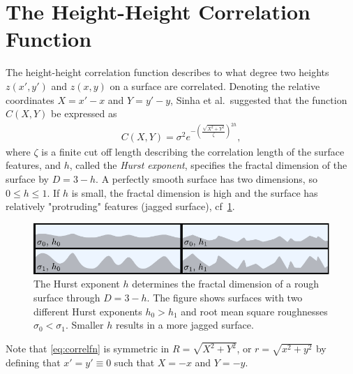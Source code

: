 \documentclass[10pt,twoside, b5paper,pdftex]{report}
\begin{document}
\section{The Height-Height Correlation Function \label{sec:Cxy}}
The height-height correlation function describes to what degree two heights $z(x',y')$ and $z(x,y)$ on a surface are correlated. Denoting the relative coordinates $X = x' - x$ and $Y = y' - y$, Sinha et al.~suggested that the function $C(X, Y)$ be expressed as 
\begin{align}
	C(X,Y) = \sigma^2 e^{-\left(\frac{\sqrt{X^2+Y^2}}{\zeta}\right)^{2h}},   \label{eq:correlfn}
\end{align}
where $\zeta$ is a finite cut off length describing the correlation length of the surface features, and $h$,  called the {\it Hurst exponent}, specifies the fractal dimension of the surface by $D = 3 - h$. A perfectly smooth surface has two dimensions, so $0 \leq h \leq 1 $. If $h$ is small, the fractal dimension is high and the surface has relatively "protruding" features (jagged surface), cf~\cref{fig:fractal}. 
\begin{figure}[htbp]
	\begin{center}
		\includegraphics[width=\textwidth]{figures/fractal.pdf}		
	\end{center}
	\caption{The Hurst exponent $h$ determines the fractal dimension of a rough surface through $D = 3 - h$. The figure shows surfaces with two different Hurst exponents $h_0 > h_1$ and root mean square roughnesses $\sigma_0 < \sigma_1$. Smaller $h$ results in a more jagged surface.\label{fig:fractal}}
\end{figure}
Note that \cref{eq:correlfn} is symmetric in $R = \sqrt{X^2 + Y^2}$, or $r = \sqrt{{x}^2 + {y}^2}$ by defining that $x' = y' \equiv 0$ such that $X = -x$ and $Y = -y$. 
\end{document}
